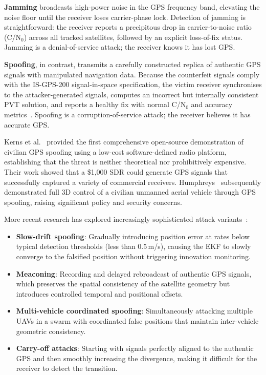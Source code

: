 \textbf{Jamming} broadcasts high-power noise in the GPS frequency band, elevating the noise floor until the receiver loses carrier-phase lock. Detection of jamming is straightforward: the receiver reports a precipitous drop in carrier-to-noise ratio (C/N$_0$) across all tracked satellites, followed by an explicit loss-of-fix status. Jamming is a denial-of-service attack; the receiver knows it has lost GPS.

\textbf{Spoofing}, in contrast, transmits a carefully constructed replica of authentic GPS signals with manipulated navigation data. Because the counterfeit signals comply with the IS-GPS-200 signal-in-space specification, the victim receiver synchronises to the attacker-generated signals, computes an incorrect but internally consistent PVT solution, and reports a healthy fix with normal C/N$_0$ and accuracy metrics~\cite{Zhang2020}. Spoofing is a corruption-of-service attack; the receiver believes it has accurate GPS.

Kerns et al.~\cite{Kerns2014} provided the first comprehensive open-source demonstration of civilian GPS spoofing using a low-cost software-defined radio platform, establishing that the threat is neither theoretical nor prohibitively expensive. Their work showed that a \$1,000 SDR could generate GPS signals that successfully captured a variety of commercial receivers. Humphreys~\cite{Humphreys2012} subsequently demonstrated full 3D control of a civilian unmanned aerial vehicle through GPS spoofing, raising significant policy and security concerns.

More recent research has explored increasingly sophisticated attack variants~\cite{Owen2019}:
\begin{itemize}
    \item \textbf{Slow-drift spoofing}: Gradually introducing position error at rates below typical detection thresholds (less than 0.5\,m/s), causing the EKF to slowly converge to the falsified position without triggering innovation monitoring.
    \item \textbf{Meaconing}: Recording and delayed rebroadcast of authentic GPS signals, which preserves the spatial consistency of the satellite geometry but introduces controlled temporal and positional offsets.
    \item \textbf{Multi-vehicle coordinated spoofing}: Simultaneously attacking multiple UAVs in a swarm with coordinated false positions that maintain inter-vehicle geometric consistency.
    \item \textbf{Carry-off attacks}: Starting with signals perfectly aligned to the authentic GPS and then smoothly increasing the divergence, making it difficult for the receiver to detect the transition.
\end{itemize}

